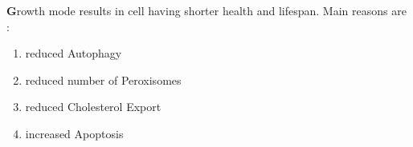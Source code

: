 \textbf Growth mode results in cell having shorter health and lifespan. Main reasons are :
\begin{enumerate}
\item reduced Autophagy
\item reduced number of Peroxisomes 
\item reduced Cholesterol Export
\item increased Apoptosis
\end{enumerate}